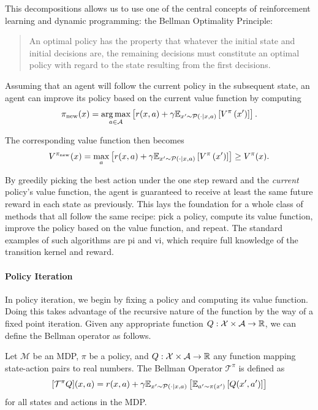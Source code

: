 This decompositions allows us to use one of the central concepts of reinforcement learning and dynamic programming: the Bellman Optimality Principle:
\begin{quote}
    An optimal policy has the property that whatever the initial state and initial decisions are, the remaining decisions must constitute an optimal policy with regard to the state resulting from the first decisions. \parencite{bellman1953}
\end{quote}
Assuming that an agent will follow the current policy in the subsequent state, an agent can improve its policy based on the current value function by computing $$\pi_\mathrm{new}(x) = \operatorname*{arg\,max}_{a \in \mathcal{A}} \left[r(x,a) + \gamma \mathbb{E}_{x'\sim\mathcal{P}(\cdot|x,a)}\left[V^\pi\left(x'\right)\right]\right].$$

The corresponding value function then becomes
$$V^{\pi_\mathrm{new}}(x) = \max_a \left[r(x,a) + \gamma \mathbb{E}_{x'\sim\mathcal{P}(\cdot|x,a)}\left[V^\pi\left(x'\right)\right]\right] \geq V^\pi(x).$$

By greedily picking the best action under the one step reward and the \emph{current} policy's value function, the agent is guaranteed to receive at least the same future reward in each state as previously.
This lays the foundation for a whole class of methods that all follow the same recipe: pick a policy, compute its value function, improve the policy based on the value function, and repeat.
The standard examples of such algorithms are \ac{pi} and \ac{vi}, which require full knowledge of the transition kernel and reward.

\paragraph{Policy Iteration}

In policy iteration, we begin by fixing a policy and computing its value function.
Doing this takes advantage of the recursive nature of the function by the way of a fixed point iteration.
Given any appropriate function $Q: \mathcal{X} \times \mathcal{A} \rightarrow \mathbb{R}$, we can define the Bellman operator as follows.

\begin{definition}
    Let $\mathcal{M}$ be an MDP, $\pi$ be a policy, and $Q: \mathcal{X} \times \mathcal{A} \rightarrow \mathbb{R}$ any function mapping state-action pairs to real numbers.
    The Bellman Operator $\mathcal{T}^\pi$ is defined as
    $$[\mathcal{T}^\pi Q](x,a) = r(x,a) + \gamma \mathbb{E}_{x'\sim \mathcal{P}(\cdot|x,a)}\left[\mathbb{E}_{a'\sim\pi(x')}\left[Q(x',a')\right]\right]$$ for all states and actions in the MDP.
\end{definition}

